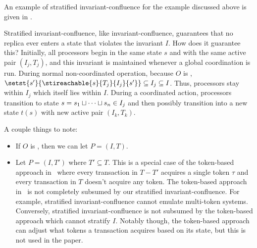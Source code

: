 An example of stratified invariant-confluence for the example discussed above
is given in .

{}

Stratified invariant-confluence, like invariant-confluence, guarantees that no
replica ever enters a state that violates the invariant $I$. How does it
guarantee this?
%
Initially, all processors begin in the same state $s$ and with the same active
pair $(I_j, T_j)$, and this invariant is maintained whenever a global
coordination is run. During normal non-coordinated operation, because $O$ is
, $\setst{s'}{\stireachable{s}{T_j}{I_j}{s'}}
\subseteq I_j \subseteq I$. Thus, processors stay within $I_j$ which itself
lies within $I$. During a coordinated action, processors transition to state $s
= s_1 \sqcup \cdots \sqcup s_n \in I_j$ and then possibly transition into a new
state $t(s)$ with new active pair $(I_k, T_k)$.

A couple things to note:
\begin{itemize}
  \item
    If $O$ is \sTIconfluent{}, then we can let $P = (I, T)$.

  \item
    Let $P = (I, T')$ where $T' \subseteq T$. This is a special case of the
    token-based approach in~\cite{gotsman2016cause} where every transaction in
    $T - T'$ acquires a single token $\tau$ and every transaction in $T$
    doesn't acquire any token. The token-based approach
    in~\cite{gotsman2016cause} is not completely subsumed by our stratified
    invariant-confluence. For example, stratified invariant-confluence cannot
    emulate multi-token systems. Conversely, stratified invariant-confluence is
    not subsumed by the token-based approach which cannot stratify $I$. Notably
    though, the token-based approach can adjust what tokens a transaction
    acquires based on its state, but this is not used in the paper.
\end{itemize}

